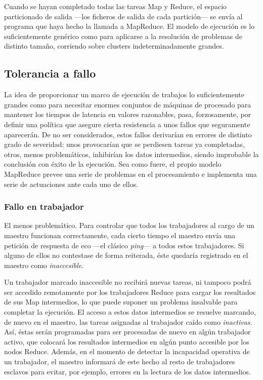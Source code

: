 Cuando se hayan completado todas las tareas Map y Reduce, el espacio particionado de salida ---los ficheros de salida de cada partici\'on--- se env\'ia al programa que haya hecho la llamada a MapReduce.
El modelo de ejecuci\'on es lo suficientemente gen\'erico como para aplicarse a la resoluci\'on de problemas de distinto tama\~no, corriendo sobre clusters indeterminadamente grandes.


\subsection{Tolerancia a fallo}\label{subsec:toleranciafallos}
\noindent La idea de proporcionar un marco de ejecuci\'on de trabajos lo suficientemente grandes como para necesitar enormes conjuntos de m\'aquinas de procesado para mantener los tiempos de latencia en valores razonables, pasa, forzosamente, por definir una pol\'itica que asegure cierta resistencia a unos fallos que seguramente aparecer\'an. De no ser considerados, estos fallos derivar\'ian en errores de distinto grado de severidad: unos provocar\'ian que se perdiesen tareas ya completadas, otros, menos problem\'aticos, inhibir\'ian los datos intermedios, siendo improbable la conclusi\'on con \'exito de la ejecuci\'on. Sea como fuere, el propio modelo MapReduce prevee una serie de problemas en el procesamiento e implementa una serie de actuaciones ante cada uno de ellos.


\subsubsection{Fallo en trabajador}\label{subsubsec:fallotrabajador}
\noindent El menos problem\'atico. Para controlar que todos los trabajadores al cargo de un maestro funcionan correctamente, cada cierto tiempo el maestro env\'ia una petici\'on de respuesta de eco ---el cl\'asico \emph{ping}--- a todos estos trabajadores. Si alguno de ellos no contestase de forma reiterada, \'este quedar\'ia registrado en el maestro como \emph{inaccesible}.\newline

Un trabajador marcado inaccesible no recibir\'a nuevas tareas, ni tampoco podr\'a ser accedido remotamente por los trabajadores Reduce para cargar los resultados de sus Map intermedios, lo que puede suponer un problema insalvable para completar la ejecuci\'on. El acceso a estos datos intermedios se resuelve marcando, de nuevo en el maestro, las tareas asignadas al trabajador ca\'ido como \emph{inactivas}. As\'i, \'estas ser\'an programadas para ser procesadas de nuevo en alg\'un trabajador activo, que colocar\'a los resultados intermedios en alg\'un punto accesible por los nodos Reduce. Adem\'as, en el momento de detectar la incapacidad operativa de un trabajador, el maestro informar\'a de este hecho al resto de trabajadores esclavos para evitar, por ejemplo, errores en la lectura de los datos intermedios.


